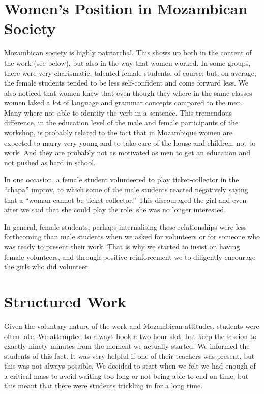 \documentclass[article,twocolumn,twoside]{memoir}
\begin{document}
\section{Women's Position in Mozambican Society}

Mozambican society is highly patriarchal. This shows up both in the content
of the work (see below), but also in the way that women worked. In some groups,
there were very charismatic, talented female students, of course; but, on
average, the female students tended to be less self-confident and come forward
less. We also noticed that women knew that even though they where in the same
classes women laked a lot of language and grammar concepts compared to the men.
Many where not able to identify the verb in a sentence. This tremendous
difference, in the education level of the male and female participants of the
workshop, is probably related to the fact that in Mozambique women are expected
to marry very young and to take care of the house and children, not to work.
And they are probably not as motivated as men to get an education and not
pushed as hard in school.

In one occasion, a female student volunteered to play ticket-collector in the
``chapa'' improv, to which some of the male students reacted negatively saying
that a ``woman cannot be ticket-collector.'' This discouraged the girl and even
after we said that she could play the role, she was no longer interested.

In general, female students, perhaps internalising these relationships were
less forthcoming than male students when we asked for volunteers or for someone
who was ready to present their work. That is why we started to insist on
having female volunteers, and through positive reinforcement we to diligently
encourage the girls who did volunteer.

\section{Structured Work}

Given the voluntary nature of the work and Mozambican attitudes, students were
often late. We attempted to always book a two hour slot, but keep the session
to exactly ninety minutes from the moment we actually started. We informed the
students of this fact. It was very helpful if one of their teachers was
present, but this was not always possible. We decided to start when we felt we
had enough of a critical mass to avoid waiting too long or not being able to
end on time, but this meant that there were students trickling in for a long
time.
\end{document}

